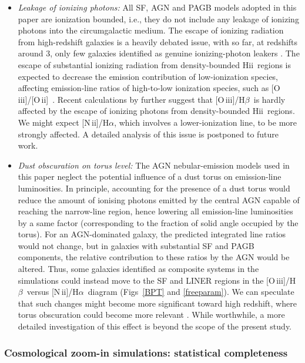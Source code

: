\documentclass[fleqn,usenatbib]{mnras}
\newcommand{\hii}{\hbox{H{\sc ii}}}
\newcommand{\oiii}{\hbox{[O\,{\sc iii}]}}
\newcommand{\oii}{\hbox{[O\,{\sc ii}]}}
\newcommand{\oiiihb}{\hbox{[O\,{\sc iii}]/H$\beta$}}
\newcommand{\niiha}{\hbox{[N\,{\sc ii}]/H$\alpha$}}
\begin{document}
\begin{itemize}
\item{\em Leakage of ionizing photons:}
All SF, AGN and PAGB models adopted in this paper are
  ionization bounded, i.e., they do not include any
 leakage of ionizing photons into the circumgalactic medium. The escape 
 of ionizing radiation from high-redshift galaxies is a heavily debated issue, 
 with so far, at redshifts around 3, only few galaxies identified as 
genuine ionizing-photon leakers \citep{deBarros16, Shapley16,Bian17}. 
The escape of substantial ionizing radiation from density-bounded \hii\ 
regions is expected to decrease the emission contribution of
low-ionization species, affecting emission-line ratios of high-to-low 
ionization species, such as \oiii/\oii\ \citep[e.g.,][and references therein]{Jaskot13}.
Recent calculations by \citet[][their fig.~6]{Izotov17} further suggest that \oiiihb\ 
is hardly affected by the escape of ionizing photons from density-bounded
\hii\ regions. We might expect \niiha, which involves a lower-ionization line, to 
be more strongly affected. A detailed analysis of this issue is
  postponed to future work.   

\item{\em Dust obscuration on torus level:}
The AGN nebular-emission models used in this paper neglect the 
potential influence of a dust torus on emission-line luminosities. In
principle, accounting for the presence of a dust torus would reduce 
the amount of ionising photons emitted by the central AGN capable 
of reaching the narrow-line region, hence lowering all emission-line 
luminosities by a same factor (corresponding to the fraction of solid
angle occupied by the torus). For an AGN-dominated galaxy, the
predicted integrated line ratios would not change, but in galaxies with 
substantial SF and PAGB components, the relative 
contribution to these ratios by the AGN would be altered. Thus, some
galaxies identified as composite systems in the simulations could 
instead move to the SF and LINER regions in the
\oiiihb\ versus \niiha\ diagram (Figs~\ref{BPT} and \ref{freeparam}).
We can speculate that such changes might become more significant toward
high redshift, where torus obscuration could become more relevant
\citep[e.g.][]{Hasinger08}. While worthwhile, a more detailed investigation
of this effect is beyond the scope of the present study.
\end{itemize}


\subsubsection{Cosmological zoom-in simulations: statistical completeness}
\end{document}
